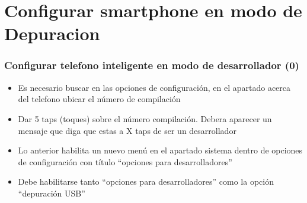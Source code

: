 
\section{Configurar smartphone en modo de Depuracion}

\begin{frame}
\frametitle{Configurar telefono inteligente en modo de desarrollador (0)}  
\begin{itemize}
\item Es necesario buscar en las opciones de configuraci\'on, en el apartado acerca del telefono ubicar el n\'umero de compilaci\'on 
\item Dar 5 taps (toques) sobre el n\'umero compilaci\'on. Debera aparecer un mensaje que diga que estas a X taps de ser un desarrollador 
\item Lo anterior habilita un nuevo men\'u en el apartado sistema dentro de opciones de configuraci\'on con t\'itulo ``opciones para desarrolladores'' 
\item Debe habilitarse tanto ``opciones para desarrolladores'' como la opci\'on ``depuraci\'on USB''
\end{itemize}

\end{frame}



